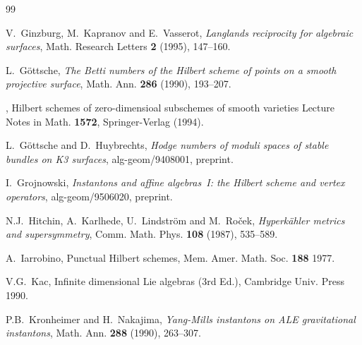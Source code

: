 \documentclass[12pt]{amsart}
\theoremstyle{definition}
\theoremstyle{remark}
\numberwithin{equation}{section}
\begin{document}
\begin{thebibliography}{99}

 V.~Ginzburg, M.~Kapranov and E.~Vasserot,
{\it Langlands reciprocity for algebraic surfaces},
Math. Research Letters {\bf 2} (1995), 147--160.

 L.~G\"ottsche,
{\it The Betti numbers of the Hilbert scheme of points on a smooth
  projective surface},
Math. Ann. {\bf 286} (1990), 193--207.

 \bysame,
{Hilbert schemes of zero-dimensioal subschemes of smooth varieties}
Lecture Notes in Math. {\bf 1572}, Springer-Verlag (1994).

 L.~G\"ottsche and D.~Huybrechts,
{\it Hodge numbers of moduli spaces of stable bundles on K3 surfaces},
alg-geom/9408001, preprint.

 I.~Grojnowski,
{\it Instantons and affine algebras~I: the Hilbert scheme and vertex
  operators},
alg-geom/9506020, preprint.

 N.J.~Hitchin, A.~Karlhede, U.~Lindstr\"om and
  M.~Ro\v cek,
{\it Hyperk\"ahler metrics and supersymmetry},
 Comm. Math. Phys. {\bf 108} (1987), 535--589.

 A.~Iarrobino,
{Punctual Hilbert schemes},
Mem. Amer. Math. Soc. {\bf 188} 1977.

 V.G.~Kac,
 {Infinite dimensional Lie algebras (3rd Ed.)},
 Cambridge Univ. Press 1990.

%
%
%


 P.B.~Kronheimer and H.~Nakajima,
 {\it Yang-Mills instantons on ALE gravitational instantons},
 Math. Ann. {\bf 288} (1990), 263--307.


\end{thebibliography}
\end{document}
